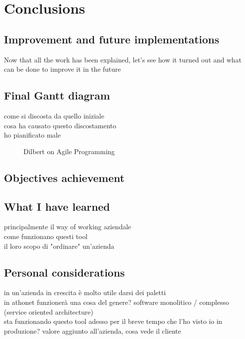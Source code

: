 \chapter{Conclusions}
\label{conclusions}

\section{Improvement and future implementations}

Now that all the work has been explained, let's see how it turned out and what can be done to improve it in the future

\section{Final Gantt diagram}
	come si discosta da quello iniziale\\
	cosa ha causato questo discostamento\\
	ho pianificato male
	
	\begin{figure}[H]
		\centering
		\caption{Dilbert on Agile Programming}
	\end{figure}
	
\section{Objectives achievement}

\section{What I have learned}
	principalmente il way of working aziendale\\
	come funzionano questi tool\\
	il loro scopo di "ordinare" un'azienda

\section{Personal considerations}
	in un'azienda in crescita è molto utile darsi dei paletti\\
	in athonet funzionerà una cosa del genere?  software monolitico / complesso (service oriented architecture)\\
	sta funzionando questo tool adesso per il breve tempo che l'ho visto io in produzione?
	valore aggiunto all'azienda, cosa vede il cliente